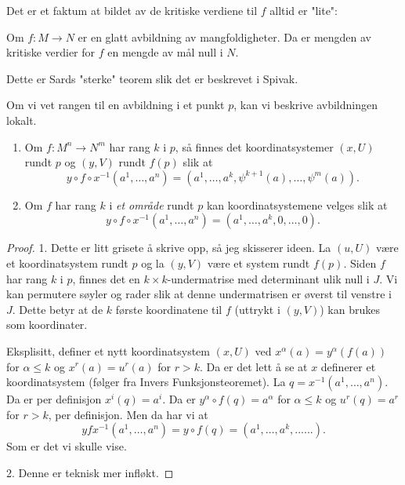 \documentclass[11pt, english]{article}
\begin{document}
Det er et faktum at bildet av de kritiske verdiene til $f$ alltid er "lite":

\begin{prop}
Om $f:M \to N$ er en glatt avbildning av mangfoldigheter. Da er mengden av kritiske verdier for $f$ en mengde av mål null i $N$.
\end{prop}

Dette er Sards "sterke" teorem slik det er beskrevet i Spivak. 

Om vi vet rangen til en avbildning i et punkt $p$, kan vi beskrive avbildningen lokalt.

\begin{prop}
\begin{enumerate}
\item Om $f: M^n \to N^m$ har rang $k$ i $p$, så finnes det koordinatsystemer $(x,U)$ rundt $p$ og $(y,V)$ rundt $f(p)$ slik at 
$$
y \circ f \circ x^{-1}(a^1,\ldots, a^n) = (a^1, \ldots, a^k, \psi^{k+1}(a), \ldots, \psi^m(a)).
$$
\item Om $f$ har rang $k$ i \emph{et område} rundt $p$ kan koordinatsystemene velges slik at
$$
y \circ f \circ x^{-1}(a^1,\ldots, a^n) = (a^1, \ldots, a^k, 0,\ldots,0).
$$
\end{enumerate}
\end{prop}
\begin{proof}
1. Dette er litt grisete å skrive opp, så jeg skisserer ideen. La $(u,U)$ være et koordinatsystem rundt $p$ og la $(y,V)$ være et system rundt $f(p)$. Siden $f$ har rang $k$ i $p$, finnes det en $k \times k$-undermatrise med determinant ulik null i $J$. Vi kan permutere søyler og rader slik at denne undermatrisen er øverst til venstre i $J$. Dette betyr at de $k$ første koordinatene til $f$ (uttrykt i $(y,V)$) kan brukes som koordinater.

Eksplisitt, definer et nytt koordinatsystem $(x,U)$ ved $x^\alpha(a) = y^\alpha(f(a))$ for $\alpha \leq k$ og $x^r(a) = u^r(a)$ for $r > k$. Da er det lett å se at $x$ definerer et koordinatsystem (følger fra Invers Funksjonsteoremet). La $q= x^{-1}(a^1, \ldots,a^n)$. Da er per definisjon $x^i(q) = a^i$. Da er $y^\alpha \circ f(q) = a^\alpha$ for $\alpha \leq k$ og $u^r(q)=a^r$ for $r > k$, per definisjon. Men da har vi at 
$$
y f x^{-1}(a^1,\ldots, a^n) = y \circ f(q) = (a^1,\ldots, a^k, ......).
$$
Som er det vi skulle vise.

2. Denne er teknisk mer infløkt. 
\end{proof}
\end{document}
